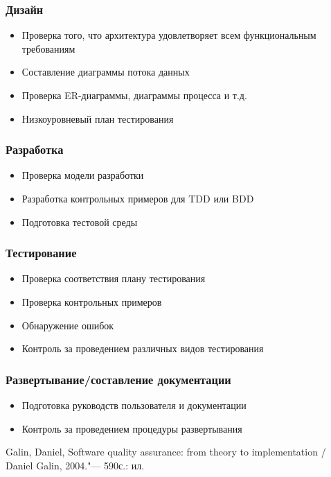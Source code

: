 \documentclass{../industrial-development}
\begin{document}
	\begin{frame} \frametitle{Дизайн}
		\begin{itemize}
			\item Проверка того, что архитектура удовлетворяет всем функциональным требованиям
			\item Составление диаграммы потока данных
			\item Проверка ER-диаграммы, диаграммы процесса и т.д.
			\item Низкоуровневый план тестирования
		\end{itemize}
	\end{frame}
	
	\begin{frame} \frametitle{Разработка}
		\begin{itemize}
			\item Проверка модели разработки
			\item Разработка контрольных примеров для TDD или BDD
			\item Подготовка тестовой среды
		\end{itemize}
	\end{frame}
	
	\begin{frame} \frametitle{Тестирование}
		\begin{itemize}
			\item Проверка соответствия плану тестирования
			\item Проверка контрольных примеров
			\item Обнаружение ошибок
			\item Контроль за проведением различных видов тестирования
		\end{itemize}
	\end{frame}
	
	\begin{frame} \frametitle{Развертывание/составление документации}
		\begin{itemize}
			\item Подготовка руководств пользователя и документации
			\item Контроль за проведением процедуры развертывания
		\end{itemize}
	\end{frame}
	
	\begin{thebibliography}{99}
		 Galin, Daniel, Software quality assurance: from theory to implementation / Daniel Galin, 2004."--- 590с.: ил.
	\end{thebibliography}
	
\end{document}
